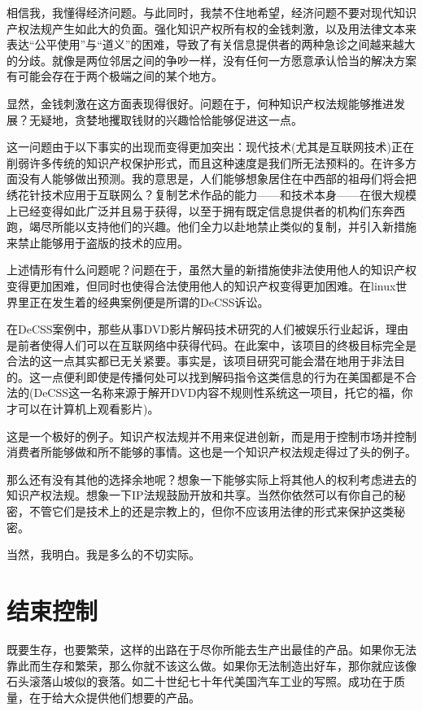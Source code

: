 相信我，我懂得经济问题。与此同时，我禁不住地希望，经济问题不要对现代知识产权法规产生如此大的负面。强化知识产权所有权的金钱刺激，以及用法律文本来表达“公平使用”与“道义”的困难，导致了有关信息提供者的两种急诊之间越来越大的分歧。就像是两位邻居之间的争吵一样，没有任何一方愿意承认恰当的解决方案有可能会存在于两个极端之间的某个地方。

显然，金钱刺激在这方面表现得很好。问题在于，何种知识产权法规能够推进发展？无疑地，贪婪地攫取钱财的兴趣恰恰能够促进这一点。

这一问题由于以下事实的出现而变得更加突出：现代技术(尤其是互联网技术)正在削弱许多传统的知识产权保护形式，而且这种速度是我们所无法预料的。在许多方面没有人能够做出预测。我的意思是，人们能够想象居住在中西部的祖母们将会把绣花针技术应用于互联网么？复制艺术作品的能力——和技术本身——在很大规模上已经变得如此广泛并且易于获得，以至于拥有既定信息提供者的机构们东奔西跑，竭尽所能以支持他们的兴趣。他们全力以赴地禁止类似的复制，并引入新措施来禁止能够用于盗版的技术的应用。

上述情形有什么问题呢？问题在于，虽然大量的新措施使非法使用他人的知识产权变得更加困难，但同时也使得合法使用他人的知识产权变得更加困难。在linux世界里正在发生着的经典案例便是所谓的DeCSS诉讼。

在DeCSS案例中，那些从事DVD影片解码技术研究的人们被娱乐行业起诉，理由是前者使得人们可以在互联网络中获得代码。在此案中，该项目的终极目标完全是合法的这一点其实都已无关紧要。事实是，该项目研究可能会潜在地用于非法目的。这一点便利即使是传播何处可以找到解码指令这类信息的行为在美国都是不合法的(DeCSS这一名称来源于解开DVD内容不规则性系统这一项目，托它的福，你才可以在计算机上观看影片)。

这是一个极好的例子。知识产权法规并不用来促进创新，而是用于控制市场并控制消费者所能够做和所不能够的事情。这也是一个知识产权法规走得过了头的例子。

那么还有没有其他的选择余地呢？想象一下能够实际上将其他人的权利考虑进去的知识产权法规。想象一下IP法规鼓励开放和共享。当然你依然可以有你自己的秘密，不管它们是技术上的还是宗教上的，但你不应该用法律的形式来保护这类秘密。

当然，我明白。我是多么的不切实际。

 
\section{结束控制}

既要生存，也要繁荣，这样的出路在于尽你所能去生产出最佳的产品。如果你无法靠此而生存和繁荣，那么你就不该这么做。如果你无法制造出好车，那你就应该像石头滚落山坡似的衰落。如二十世纪七十年代美国汽车工业的写照。成功在于质量，在于给大众提供他们想要的产品。

